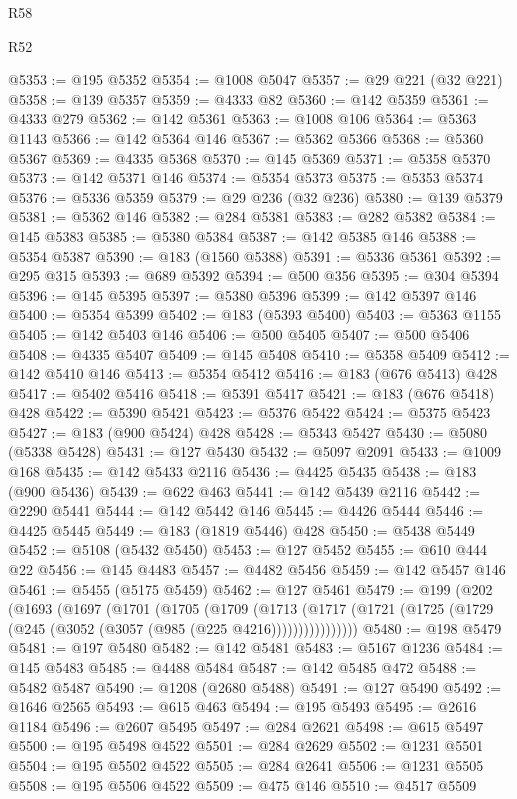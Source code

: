 \begin{lexlean}{R58}
\begin{lexlean}{R52}
\begin{coremodule}
{{{{{{{{{{{{{{{{{{{{{{{{{{{{{{{{{{{{{{{{{{{{{{{{{{{{{{{{{{{{{{{{{{{{{{{{{{{{{{{{{{{{{{{{{{{{{{{{{{{{{{{{{{{{{{{{{{{{{{{{{{{{{{{{{{{{{{{{{{{{{{{{{{{{{{{{{{{{{{{{{{{{{{{{{{{{{{{{{{{{{{{{{{{{{{{{{{{{{{@5353 := @195 @5352
@5354 := @1008 @5047
@5357 := @29 @221 (@32 @221)
@5358 := @139 @5357
@5359 := @4333 @82
@5360 := @142 @5359
@5361 := @4333 @279
@5362 := @142 @5361
@5363 := @1008 @106
@5364 := @5363 @1143
@5366 := @142 @5364 @146
@5367 := @5362 @5366
@5368 := @5360 @5367
@5369 := @4335 @5368
@5370 := @145 @5369
@5371 := @5358 @5370
@5373 := @142 @5371 @146
@5374 := @5354 @5373
@5375 := @5353 @5374
@5376 := @5336 @5359
@5379 := @29 @236 (@32 @236)
@5380 := @139 @5379
@5381 := @5362 @146
@5382 := @284 @5381
@5383 := @282 @5382
@5384 := @145 @5383
@5385 := @5380 @5384
@5387 := @142 @5385 @146
@5388 := @5354 @5387
@5390 := @183 (@1560 @5388)
@5391 := @5336 @5361
@5392 := @295 @315
@5393 := @689 @5392
@5394 := @500 @356
@5395 := @304 @5394
@5396 := @145 @5395
@5397 := @5380 @5396
@5399 := @142 @5397 @146
@5400 := @5354 @5399
@5402 := @183 (@5393 @5400)
@5403 := @5363 @1155
@5405 := @142 @5403 @146
@5406 := @500 @5405
@5407 := @500 @5406
@5408 := @4335 @5407
@5409 := @145 @5408
@5410 := @5358 @5409
@5412 := @142 @5410 @146
@5413 := @5354 @5412
@5416 := @183 (@676 @5413) @428
@5417 := @5402 @5416
@5418 := @5391 @5417
@5421 := @183 (@676 @5418) @428
@5422 := @5390 @5421
@5423 := @5376 @5422
@5424 := @5375 @5423
@5427 := @183 (@900 @5424) @428
@5428 := @5343 @5427
@5430 := @5080 (@5338 @5428)
@5431 := @127 @5430
@5432 := @5097 @2091
@5433 := @1009 @168
@5435 := @142 @5433 @2116
@5436 := @4425 @5435
@5438 := @183 (@900 @5436)
@5439 := @622 @463
@5441 := @142 @5439 @2116
@5442 := @2290 @5441
@5444 := @142 @5442 @146
@5445 := @4426 @5444
@5446 := @4425 @5445
@5449 := @183 (@1819 @5446) @428
@5450 := @5438 @5449
@5452 := @5108 (@5432 @5450)
@5453 := @127 @5452
@5455 := @610 @444 @22
@5456 := @145 @4483
@5457 := @4482 @5456
@5459 := @142 @5457 @146
@5461 := @5455 (@5175 @5459)
@5462 := @127 @5461
@5479 := @199
    (@202
      (@1693
        (@1697
          (@1701
            (@1705
              (@1709
                (@1713
                  (@1717 (@1721 (@1725 (@1729 (@245 (@3052 (@3057 (@985 (@225 @4216))))))))))))))))
@5480 := @198 @5479
@5481 := @197 @5480
@5482 := @142 @5481
@5483 := @5167 @1236
@5484 := @145 @5483
@5485 := @4488 @5484
@5487 := @142 @5485 @472
@5488 := @5482 @5487
@5490 := @1208 (@2680 @5488)
@5491 := @127 @5490
@5492 := @1646 @2565
@5493 := @615 @463
@5494 := @195 @5493
@5495 := @2616 @1184
@5496 := @2607 @5495
@5497 := @284 @2621
@5498 := @615 @5497
@5500 := @195 @5498 @4522
@5501 := @284 @2629
@5502 := @1231 @5501
@5504 := @195 @5502 @4522
@5505 := @284 @2641
@5506 := @1231 @5505
@5508 := @195 @5506 @4522
@5509 := @475 @146
@5510 := @4517 @5509
}}}}}}}}}}}}}}}}}}}}}}}}}}}}}}}}}}}}}}}}}}}}}}}}}}}}}}}}}}}}}}}}}}}}}}}}}}}}}}}}}}}}}}}}}}}}}}}}}}}}}}}}}}}}}}}}}}}}}}}}}}}}}}}}}}}}}}}}}}}}}}}}}}}}}}}}}}}}}}}}}}}}}}}}}}}}}}}}}}}}}}}}}}}}}}}}}}}}}}
\end{coremodule}
\end{lexlean}
\end{lexlean}
